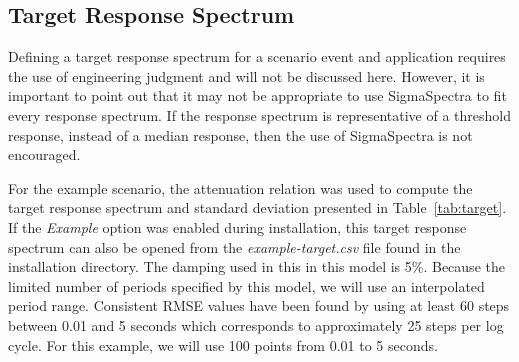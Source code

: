 \documentclass[11pt]{article}
\begin{document}
\subsection{Target Response Spectrum}
Defining a target response spectrum for a scenario event and application
requires the use of engineering judgment and will not be discussed here.
However, it is important to point out that it may not be appropriate to use
SigmaSpectra to fit every response spectrum. If the response spectrum is
representative of a threshold response, instead of a median response, then the
use of SigmaSpectra is not encouraged.

For the example scenario, the \citet{abrahamson:97} attenuation relation was
used to compute the target response spectrum and standard deviation presented in
Table~\ref{tab:target}. If the \emph{Example} option was enabled during
installation, this target response spectrum can also be opened from the
\emph{example-target.csv} file found in the installation directory. The damping
used in this in this model is 5\%. Because the limited number of periods
specified by this model, we will use an interpolated period range. Consistent
RMSE values have been found by using at least 60 steps between 0.01 and 5
seconds which corresponds to approximately 25 steps per log cycle. For this
example, we will use 100 points from 0.01 to 5 seconds.
\end{document}
